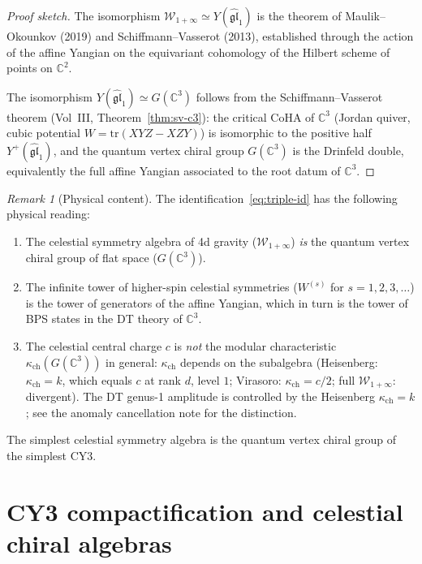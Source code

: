 \documentclass[11pt]{article}
\theoremstyle{definition}
\theoremstyle{remark}
\newtheorem{remark}[theorem]{Remark}
\newcommand{\cW}{\mathcal{W}}
\begin{document}
\begin{proof}[Proof sketch]
The isomorphism $\cW_{1+\infty} \simeq Y(\widehat{\mathfrak{gl}}_1)$
is the theorem of Maulik--Okounkov (2019) and
Schiffmann--Vasserot (2013), established through the action of the
affine Yangian on the equivariant cohomology of the Hilbert scheme
of points on $\mathbb{C}^2$.

The isomorphism $Y(\widehat{\mathfrak{gl}}_1) \simeq G(\mathbb{C}^3)$
follows from the Schiffmann--Vasserot theorem (Vol~III,
Theorem~\ref*{thm:sv-c3}): the critical CoHA of $\mathbb{C}^3$
(Jordan quiver, cubic potential $W = \mathrm{tr}(XYZ - XZY)$)
is isomorphic to the positive half
$Y^+(\widehat{\mathfrak{gl}}_1)$, and the quantum vertex chiral
group $G(\mathbb{C}^3)$ is the Drinfeld double, equivalently the full
affine Yangian associated to the root datum of $\mathbb{C}^3$.
\end{proof}

\begin{remark}[Physical content]
\label{rem:physical-content-c3}
The identification~\eqref{eq:triple-id} has the following
physical reading:
\begin{enumerate}[label=(\alph*)]
\item The celestial symmetry algebra of 4d gravity
 ($\cW_{1+\infty}$) \emph{is} the quantum vertex chiral group
 of flat space ($G(\mathbb{C}^3)$).
\item The infinite tower of higher-spin celestial symmetries
 ($W^{(s)}$ for $s = 1, 2, 3, \ldots$) is the tower of generators
 of the affine Yangian, which in turn is the tower of BPS states
 in the DT theory of $\mathbb{C}^3$.
\item The celestial central charge $c$ is \emph{not} the modular
 characteristic $\kappa_{\mathrm{ch}}(G(\mathbb{C}^3))$ in general: $\kappa_{\mathrm{ch}}$ depends
 on the subalgebra (Heisenberg: $\kappa_{\mathrm{ch}} = k$, which equals $c$ at rank $d$, level $1$; Virasoro: $\kappa_{\mathrm{ch}} = c/2$;
 full $\cW_{1+\infty}$: divergent). The DT genus-1 amplitude is
 controlled by the Heisenberg $\kappa_{\mathrm{ch}} = k$; see the anomaly cancellation
 note for the distinction.
\end{enumerate}
The simplest celestial symmetry algebra is the quantum vertex
chiral group of the simplest CY3.
\end{remark}

\section{CY3 compactification and celestial chiral algebras}
\label{sec:cy3-celestial}
\end{document}
